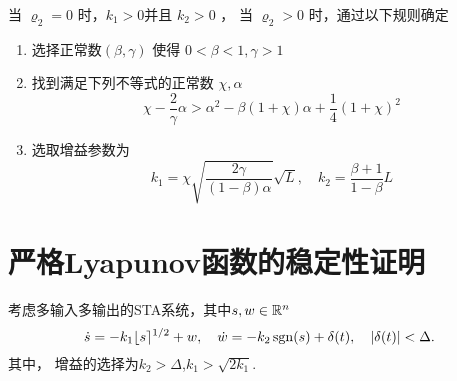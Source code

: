 \begin{algo}\label{algo sta moreno}
	当 $\varrho_2=0$ 时，$k_1>0$并且 $k_2>0$ ，
	当 $\varrho_2>0$ 时，通过以下规则确定
	\begin{enumerate}
		\item  选择正常数$(\beta,\gamma)$ 使得 $0<\beta<1,\gamma>1$
		\item 找到满足下列不等式的正常数 $\chi,\alpha$
		\begin{equation}
			\chi-\frac{2}{\gamma}\alpha
			>\alpha^2-\beta (1+\chi)\alpha+\frac14 (1+\chi)^2
		\end{equation}
		\item 选取增益参数为
		\begin{equation}
			k_1=\chi \sqrt{\frac{2\gamma}{(1-\beta)\alpha}}\sqrt{L},\quad 
			k_2=\frac{\beta+1}{1-\beta}L
		\end{equation}
	\end{enumerate}
\end{algo}

\section{严格Lyapunov函数的稳定性证明}



\begin{proposition}
	\cite[Proposition 1]{morenoStrictLyapunovFunctions2014}
	考虑多输入多输出的STA系统，其中$s,w\in\mathbb{R}^n$
	\begin{equation}
		\dot{s}=-k_1 \lfloor s \rceil^{1/2}+w,\quad 
		\dot{w}=-k_2 \mathop{\mathrm{sgn}} (s)+\delta(t),\quad 
		|\delta(t)|<\Delta.
	\end{equation}
	其中， 增益的选择为$k_2>\Delta$,$k_1>\sqrt{2k_1}$.
\end{proposition}

